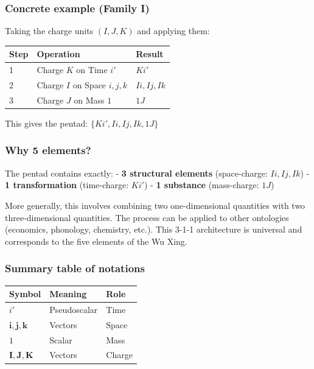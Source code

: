 \documentclass[11pt]{article}
\begin{document}
\hypertarget{concrete-example-family-i}{%
\subsubsection{Concrete example (Family
I)}\label{concrete-example-family-i}}

Taking the charge units \((I, J, K)\) and applying them:

\begin{longtable}[]{@{}lll@{}}
\toprule
Step & Operation & Result \\
\midrule
\endhead
1 & Charge \(K\) on Time \(i'\) & \(Ki'\) \\
2 & Charge \(I\) on Space \(i, j, k\) & \(Ii, Ij, Ik\) \\
3 & Charge \(J\) on Mass \(1\) & \(1J\) \\
\bottomrule
\end{longtable}

This gives the pentad: \(\{Ki', Ii, Ij, Ik, 1J\}\)

\hypertarget{why-5-elements}{%
\subsubsection{Why 5 elements?}\label{why-5-elements}}

The pentad contains exactly: - \textbf{3 structural elements}
(space-charge: \(Ii, Ij, Ik\)) - \textbf{1 transformation} (time-charge:
\(Ki'\)) - \textbf{1 substance} (mass-charge: \(1J\))

More generally, this involves combining two one-dimensional quantities
with two three-dimensional quantities. The process can be applied to
other ontologies (economics, phonology, chemistry, etc.). This 3-1-1
architecture is universal and corresponds to the five elements of the Wu
Xing.

\hypertarget{summary-table-of-notations}{%
\subsubsection{Summary table of
notations}\label{summary-table-of-notations}}

\begin{longtable}[]{@{}lll@{}}
\toprule
Symbol & Meaning & Role \\
\midrule
\endhead
\(i'\) & Pseudoscalar & Time \\
\(\mathbf{i}, \mathbf{j}, \mathbf{k}\) & Vectors & Space \\
\(1\) & Scalar & Mass \\
\(\mathbf{I}, \mathbf{J}, \mathbf{K}\) & Vectors & Charge \\
\bottomrule
\end{longtable}
\end{document}
